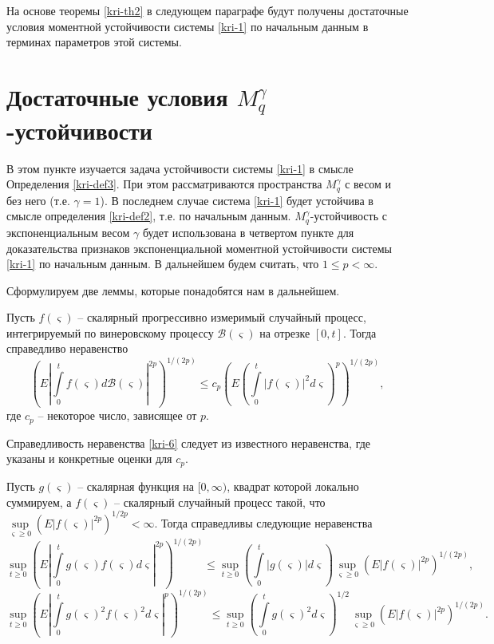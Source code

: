 На основе теоремы \ref{kri-th2} в следующем параграфе будут получены достаточные
условия моментной устойчивости системы \eqref{kri-1} по начальным данным в
терминах параметров этой системы.

\section{Достаточные условия \texorpdfstring{$M_q^\gamma$}{Mq}-устойчивости}

В этом
пункте изучается задача устойчивости системы \eqref{kri-1} в смысле
Определения \ref{kri-def3}. При этом рассматриваются пространства  $M_q^\gamma$ с
весом и без него (т.е. $\gamma=1$). В последнем случае система \eqref{kri-1}
будет устойчива в смысле определения \ref{kri-def2}, т.е. по начальным данным.
$M_q^\gamma$-устойчивость с экспоненциальным весом $\gamma$ будет
использована в четвертом пункте для доказательства признаков
экспоненциальной моментной устойчивости системы \eqref{kri-1} по начальным
данным. В дальнейшем будем считать, что $1 \leq p < \infty $.

Сформулируем две леммы, которые понадобятся нам в дальнейшем.

\begin{lemma}\label{kri-lem2} Пусть $f(\varsigma )$ -- скалярный прогрессивно
измеримый  случайный процесс, интегрируемый по винеровскому процессу
$\mathcal B(\varsigma)$ на отрезке $[0, t]$. Тогда справедливо
неравенство
\begin{equation}\label{kri-6}
\left(E\left|\int \limits _0^tf(\varsigma )d\mathcal B(\varsigma
)\right|^{2p}\right)^{1/(2p)} \leq c_p \left(E\left(\int \limits
_0^t|f(\varsigma )|^2d\varsigma\right)^p\right)^{1/(2p)},
\end{equation}
где $c_p$ -- некоторое число, зависящее от $p$.
\end{lemma}

Справедливость неравенства \eqref{kri-6} следует из известного неравенства,
где указаны и конкретные оценки для $c_p$.

\begin{lemma}\label{kri-lem3} Пусть $g(\varsigma)$ -- скалярная функция на $[0,
\infty)$, квадрат которой локально суммируем, а $f(\varsigma)$ --
скалярный случайный процесс такой, что $\sup \limits _{\varsigma
\geq 0}(E|f(\varsigma )|^{2p})^{1/2p} < \infty$. Тогда справедливы
следующие неравенства
\begin{equation}\label{kri-7}
\sup \limits _{t \geq 0}\left(E\left|\int \limits
_0^tg(\varsigma)f(\varsigma)d\varsigma\right|^{2p}\right)^{1/(2p)}
\leq \sup \limits _{t \geq 0}\left(\int \limits
_0^t|g(\varsigma)|d\varsigma\right)\sup \limits _{\varsigma \geq
0}\left(E\left|f(\varsigma)\right|^{2p}\right)^{1/(2p)},
\end{equation}
\begin{equation}\label{kri-8}
\sup \limits _{t \geq 0}\left(E|\int \limits
_0^tg(\varsigma)^2f(\varsigma)^2d\varsigma|^{p}\right)^{1/(2p)} \leq
\sup \limits _{t \geq 0}\left(\int \limits
_0^tg(\varsigma)^2d\varsigma\right)^{1/2}\sup \limits _{\varsigma
\geq 0}\left(E\left|f(\varsigma)\right|^{2p}\right)^{1/(2p)}.
\end{equation}
\end{lemma}

